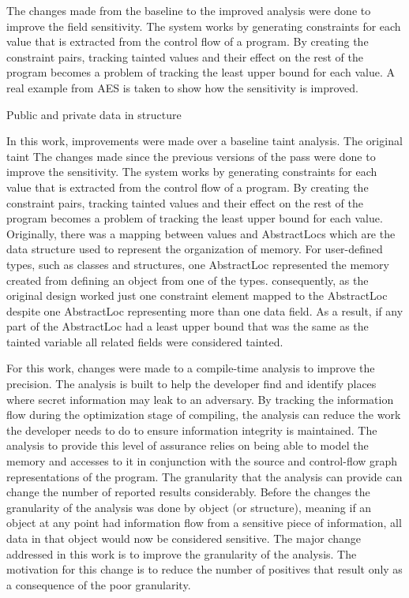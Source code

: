 \documentclass[11pt,a4paper]{article}
\begin{document}
The changes made from the baseline to the improved analysis were done to improve
the field sensitivity. The system works by generating constraints for each value
that is extracted from the control flow of a program. By creating the constraint
pairs, tracking tainted values and their effect on the rest of the program
becomes a problem of tracking the least upper bound for each value. A real
example from AES is taken to show how the sensitivity is improved.

\begin{algorithm}
  \caption{Public and private data in structure}
  \label{alg:aes_struclt}
  
\end{algorithm}

  In this work, improvements were made over a baseline taint analysis. The
  original taint  
  The changes made since the previous versions of the pass were done to improve
  the sensitivity. The system works by generating constraints for each value that
  is extracted from the control flow of a program. By creating the constraint
  pairs, tracking tainted values and their effect on  the rest of the program
  becomes a problem of tracking the least upper bound for each value.  Originally,
  there was a mapping between values and AbstractLocs which are the data structure
  used to represent the organization of memory. For user-defined types, such as
  classes and structures, one AbstractLoc represented the memory created from
  defining an object from one of the types. consequently, as the original design
  worked just one constraint element mapped to the AbstractLoc despite one
  AbstractLoc representing more than one data field. As a result, if any part of
  the AbstractLoc had a least upper bound that was the same as the tainted
  variable all related fields were considered tainted.

  For this work, changes were made to a compile-time analysis to improve
  the precision. The analysis is built to help the developer find and identify
  places where secret information may leak to an adversary. By tracking the
  information flow during the optimization stage of compiling, the analysis can
  reduce the work the developer needs to do to ensure information integrity is
  maintained. The analysis to provide this level of assurance relies on being
  able to model the memory and accesses to it in conjunction with the source
  and control-flow graph representations of the program. The granularity
  that the analysis can provide can change the number of reported results
  considerably. Before the changes the granularity of the analysis was done
  by object (or structure), meaning if an object at any point had information
  flow from a sensitive piece of information, all data in that object would
  now be considered sensitive. The major change addressed in this work is to
  improve the granularity of the analysis. The motivation for this change is
  to reduce the number of positives that result only as a consequence of the
  poor granularity.
\end{document}
